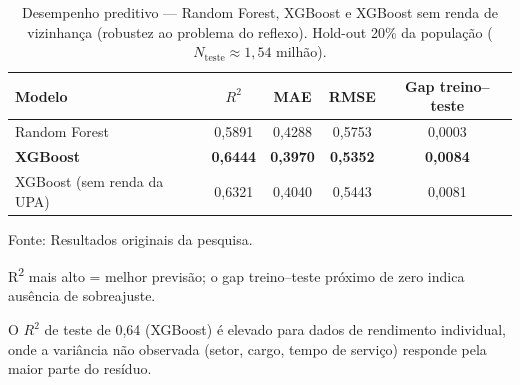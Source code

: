 \documentclass[11pt, a4paper, oneside]{article}
\begin{document}
\begin{table}[H]
\centering
\caption{Desempenho preditivo --- Random Forest, XGBoost e XGBoost sem renda de vizinhança (robustez ao problema do reflexo).
          {Hold-out} 20\% da população ($N_\text{teste}\approx 1{,}54$ milhão).}
\label{tab:ml_perf}
\begin{tabular}{lcccc}
\toprule
\textbf{Modelo} & $R^2$ & \textbf{MAE} & \textbf{RMSE} & \textbf{Gap treino--teste} \\
\midrule
Random Forest & 0,5891 & 0,4288 & 0,5753 & 0,0003 \\
\textbf{XGBoost} & \textbf{0,6444} & \textbf{0,3970} & \textbf{0,5352} & \textbf{0,0084} \\
XGBoost (sem renda da UPA) & 0,6321 & 0,4040 & 0,5443 & 0,0081 \\
\bottomrule
\end{tabular}
\par\smallskip\footnotesize Fonte: Resultados originais da pesquisa.
\end{table}
 R\textsuperscript{2} mais alto = melhor previsão; o {gap} treino--teste próximo de zero indica ausência de sobreajuste.

O $R^2$ de teste de 0{,}64 (XGBoost) é elevado para dados de rendimento individual,
onde a variância não observada (setor, cargo, tempo de serviço) responde
pela maior parte do resíduo.
\end{document}
